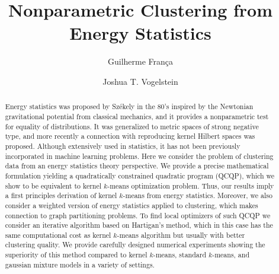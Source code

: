 \documentclass[aps,preprint,nofootinbib,floatfix]{revtex4-1}
\begin{document}
\title{Nonparametric Clustering from  Energy Statistics}

\author{Guilherme Fran\c ca}

\author{Joshua T. Vogelstein}



\begin{abstract}
Energy statistics 
was proposed by 
Sz\' ekely in the 80's
inspired by the Newtonian gravitational potential from classical mechanics,
and it provides a nonparametric test for equality of distributions.
It was generalized to 
metric spaces of strong negative type,
and more recently a connection with reproducing kernel Hilbert spaces 
was proposed.
Although  
extensively used in statistics, it
has not been previously incorporated in machine learning problems.
Here we consider the problem of clustering data from
an energy statistics theory perspective.
We provide a precise mathematical formulation yielding
a quadratically constrained quadratic program (QCQP), which we show
to be equivalent
to kernel $k$-means optimization problem.
Thus, our results imply a first principles derivation of 
kernel $k$-means from energy statistics.
Moreover, we also consider a weighted version of energy statistics 
applied to clustering, which makes connection to 
graph partitioning problems.
To find local optimizers of such QCQP we consider an iterative
algorithm based on Hartigan's method, which in this case
has the same computational cost 
as kernel $k$-means algorithm but usually with better clustering
quality. We provide carefully designed numerical experiments
showing the superiority of this method compared to
kernel $k$-means, standard $k$-means, and gaussian mixture models in a variety of settings.
\end{abstract}

\maketitle

\end{document}
